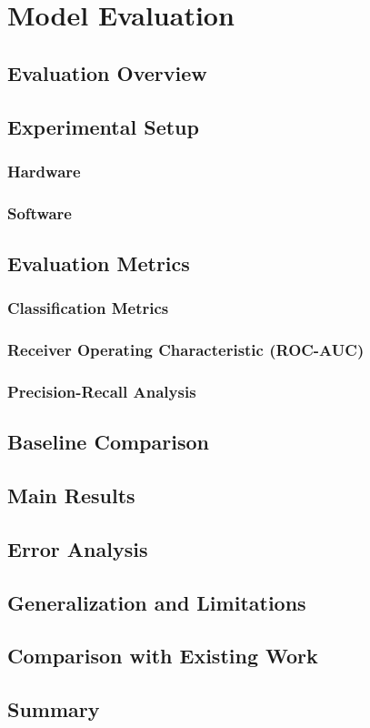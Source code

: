 \chapter{Model Evaluation}

\section{Evaluation Overview}
\section{Experimental Setup}
\subsection{Hardware}
\subsection{Software}

\section{Evaluation Metrics}
\subsection{Classification Metrics}
\subsection{Receiver Operating Characteristic (ROC-AUC)}
\subsection{Precision-Recall Analysis}

\section{Baseline Comparison}

\section{Main Results}

\section{Error Analysis}

\section{Generalization and Limitations}

\section{Comparison with Existing Work}

\section{Summary}